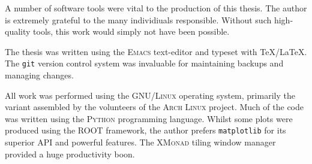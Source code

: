\begin{colophon}
A number of software tools were vital to the production of this thesis. The
author is extremely grateful to the many individiuals responsible. Without such
high-quality tools, this work would simply not have been possible.

The thesis was written using the \textsc{Emacs} text-editor and typeset with
\TeX/\LaTeX. The \texttt{git} version control system was invaluable for
maintaining backups and managing changes.

All work was performed using the \textsc{GNU/Linux} operating system, primarily
the variant assembled by the volunteers of the \textsc{Arch Linux} project. Much
of the code was written using the \textsc{Python} programming language. Whilst
some plots were produced using the \textsc{ROOT} framework, the author prefers
\texttt{matplotlib} for its superior API and powerful features. The
\textsc{XMonad} tiling window manager provided a huge productivity boon.
\end{colophon}


